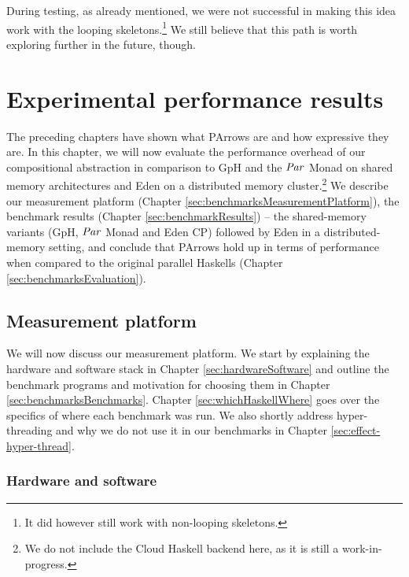 \documentclass[paper=A4,twoside=true,openright,parskip=full,chapterprefix=true,headings=normal,bibliography=totoc,listof=totoc,titlepage=on,captions=tableabove,draft=false,british]{scrreprt}%
\begin{document}
During testing, as already mentioned, we were not successful in making
this idea work with the looping skeletons.\footnote{It did however still
  work with non-looping skeletons.} We still believe that this path is
worth exploring further in the future, though.

\hypertarget{experimental-performance-results}{%
\chapter{Experimental performance
results}\label{experimental-performance-results}}

\label{sec:benchmarks}

The preceding chapters have shown what PArrows are and how expressive
they are. In this chapter, we will now evaluate the performance overhead
of our compositional abstraction in comparison to GpH and the \ensuremath{\Conid{Par}}
Monad on shared memory architectures and Eden on a distributed memory
cluster.\footnote{We do not include the Cloud Haskell backend here, as
  it is still a work-in-progress.} We describe our measurement platform
(Chapter \ref{sec:benchmarksMeasurementPlatform}), the benchmark results
(Chapter \ref{sec:benchmarkResults}) -- the shared-memory variants (GpH,
\ensuremath{\Conid{Par}} Monad and Eden CP) followed by Eden in a distributed-memory
setting, and conclude that PArrows hold up in terms of performance when
compared to the original parallel Haskells (Chapter
\ref{sec:benchmarksEvaluation}).

\hypertarget{measurement-platform}{%
\section{Measurement platform}\label{measurement-platform}}

\label{sec:benchmarksMeasurementPlatform}

We will now discuss our measurement platform. We start by explaining the
hardware and software stack in Chapter \ref{sec:hardwareSoftware} and
outline the benchmark programs and motivation for choosing them in
Chapter \ref{sec:benchmarksBenchmarks}. Chapter
\ref{sec:whichHaskellWhere} goes over the specifics of where each
benchmark was run. We also shortly address hyper-threading and why we do
not use it in our benchmarks in Chapter \ref{sec:effect-hyper-thread}.

\hypertarget{hardware-and-software}{%
\subsection{Hardware and software}\label{hardware-and-software}}
\end{document}
